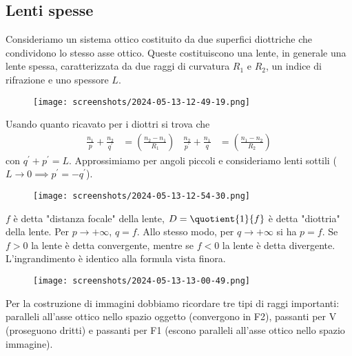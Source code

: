 \subsection{Lenti spesse}
Consideriamo un sistema ottico costituito da due superfici diottriche che condividono lo stesso asse ottico. Queste costituiscono una lente, in generale una lente spessa, caratterizzata da due raggi di curvatura \(R_1\) e \(R_2\), un indice di rifrazione e uno spessore \(L\).
\begin{figure}[H]
	\centering
	\texttt{[image: screenshots/2024-05-13-12-49-19.png]}
\end{figure}
Usando quanto ricavato per i diottri si trova che
\begin{align}
	\frac{n_1}{p} + \frac{n_2}{q^{\prime} } &= \left( \frac{n_2 - n_1}{R_1} \right) &
	\frac{n_2}{p^{\prime} } + \frac{n_1}{q} &= \left( \frac{n_1 - n_2}{R_2} \right) 
\end{align}
con \(q^{\prime} + p^{\prime} = L\). Approssimiamo per angoli piccoli e consideriamo lenti sottili (\(L\to 0 \implies p^{\prime} =-q^{\prime} \)).
\begin{figure}[H]
	\centering
	\texttt{[image: screenshots/2024-05-13-12-54-30.png]}
\end{figure}
\(f\) è detta "distanza focale" della lente, \(D=\quotient{1}{f} \) è detta "diottria" della lente. Per \(p\to +\infty \), \(q=f\). Allo stesso modo, per \(q \to +\infty \) si ha \(p=f\). Se \(f>0\) la lente è detta convergente, mentre se \(f<0\) la lente è detta divergente. L'ingrandimento è identico alla formula vista finora.
\begin{figure}[H]
	\centering
	\texttt{[image: screenshots/2024-05-13-13-00-49.png]}
\end{figure}
Per la costruzione di immagini dobbiamo ricordare tre tipi di raggi importanti: paralleli all'asse ottico nello spazio oggetto (convergono in F2), passanti per V (proseguono dritti) e passanti per F1 (escono paralleli all'asse ottico nello spazio immagine).